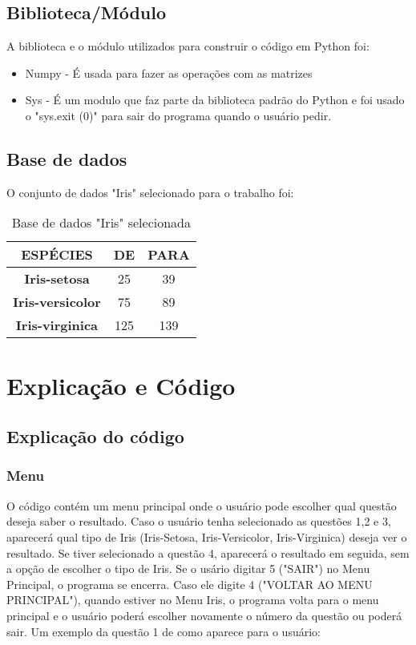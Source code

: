 \documentclass[a4paper,12pt,twoside]{article}
\begin{document}
\subsection{Biblioteca/Módulo}
A biblioteca e o módulo utilizados para construir o código em Python foi:
\begin{itemize}
   \item Numpy - É usada para fazer as operações com as matrizes
   \item Sys - É um modulo que faz parte da biblioteca padrão do Python e foi usado o "sys.exit (0)" para sair do programa quando o usuário pedir.
 \end{itemize}
 \subsection{Base de dados}
 O  conjunto de dados "Iris" selecionado para o trabalho foi:
 \begin{table}[H]
\begin{tabular}{|c|c|c|} \hline
\textbf{ESPÉCIES} & DE & PARA \\\hline
\textbf{Iris-setosa}  & 25 & 39 \\\hline
\textbf{Iris-versicolor} & 75 & 89  \\\hline
\textbf{Iris-virginica} & 125 & 139 \\\hline

 
\end{tabular}
\label{tabela2}
\centering
\caption{Base de dados "Iris" selecionada}
\label {tabela2}
\end{table}



\section{Explicação e Código}
\subsection{Explicação do código}

\subsubsection{Menu}
O código contém um menu principal onde o usuário pode escolher qual questão deseja saber o resultado. Caso o usuário tenha selecionado as questões 1,2 e 3, aparecerá qual tipo de Iris (Iris-Setosa, Iris-Versicolor, Iris-Virginica) deseja ver o resultado. Se tiver selecionado a questão 4, aparecerá o resultado em seguida, sem a opção de escolher o tipo de Iris. Se o usário digitar 5 ("SAIR") no Menu Principal, o programa se encerra. Caso ele digite 4 ("VOLTAR AO MENU PRINCIPAL"), quando estiver no Menu Iris, o programa volta para o menu principal e o usuário poderá escolher novamente o número da questão ou poderá sair. 
Um exemplo da questão 1 de como aparece para o usuário:
\end{document}

